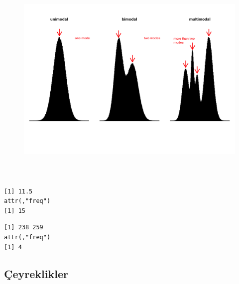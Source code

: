 \documentclass[
  letterpaper,
  DIV=11,
  numbers=noendperiod]{scrreprt}
\newenvironment{Shaded}{\begin{snugshade}}{\end{snugshade}}
\newcommand{\AttributeTok}[1]{\textcolor[rgb]{0.40,0.45,0.13}{#1}}
\newcommand{\CommentTok}[1]{\textcolor[rgb]{0.37,0.37,0.37}{#1}}
\newcommand{\ConstantTok}[1]{\textcolor[rgb]{0.56,0.35,0.01}{#1}}
\newcommand{\FunctionTok}[1]{\textcolor[rgb]{0.28,0.35,0.67}{#1}}
\newcommand{\NormalTok}[1]{\textcolor[rgb]{0.00,0.23,0.31}{#1}}
\newcommand{\SpecialCharTok}[1]{\textcolor[rgb]{0.37,0.37,0.37}{#1}}
\begin{document}
\begin{figure}

{\centering \includegraphics[width=7.125in,height=4.10417in]{images/mode.png}

}

\end{figure}

\begin{Shaded}
\end{Shaded}

\begin{verbatim}
[1] 11.5
attr(,"freq")
[1] 15
\end{verbatim}

\begin{Shaded}
\end{Shaded}

\begin{verbatim}
[1] 238 259
attr(,"freq")
[1] 4
\end{verbatim}

\hypertarget{uxe7eyreklikler}{%
\subsection*{Çeyreklikler}\label{uxe7eyreklikler}}
\end{document}
